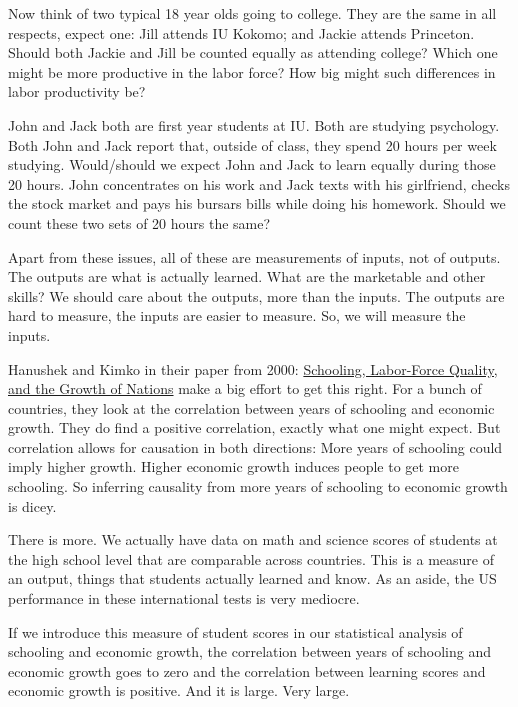 \documentclass[
]{book}
\begin{document}
Now think of two typical 18 year olds going to college. They are the same in all respects, expect one: Jill attends IU Kokomo; and Jackie attends Princeton. Should both Jackie and Jill be counted equally as attending college? Which one might be more productive in the labor force? How big might such differences in labor productivity be?

John and Jack both are first year students at IU. Both are studying psychology. Both John and Jack report that, outside of class, they spend 20 hours per week studying. Would/should we expect John and Jack to learn equally during those 20 hours. John concentrates on his work and Jack texts with his girlfriend, checks the stock market and pays his bursars bills while doing his homework. Should we count these two sets of 20 hours the same?

Apart from these issues, all of these are measurements of inputs, not of outputs. The outputs are what is actually learned. What are the marketable and other skills? We should care about the outputs, more than the inputs. The outputs are hard to measure, the inputs are easier to measure. So, we will measure the inputs.

Hanushek and Kimko in their paper from 2000: \href{https://www.researchgate.net/profile/Eric-Hanushek/publication/4980899_Schooling_Labor-Force_Quality_and_the_Growth_of_Nations/links/551427960cf283ee0834ac50/Schooling-Labor-Force-Quality-and-the-Growth-of-Nations.pdf}{Schooling, Labor-Force Quality, and the Growth of Nations} make a big effort to get this right. For a bunch of countries, they look at the correlation between years of schooling and economic growth. They do find a positive correlation, exactly what one might expect. But correlation allows for causation in both directions: More years of schooling could imply higher growth. Higher economic growth induces people to get more schooling. So inferring causality from more years of schooling to economic growth is dicey.

There is more. We actually have data on math and science scores of students at the high school level that are comparable across countries. This is a measure of an output, things that students actually learned and know. As an aside, the US performance in these international tests is very mediocre.

If we introduce this measure of student scores in our statistical analysis of schooling and economic growth, the correlation between years of schooling and economic growth goes to zero and the correlation between learning scores and economic growth is positive. And it is large. Very large.
\end{document}
